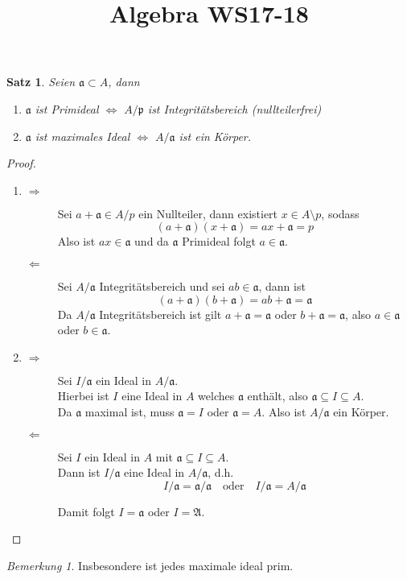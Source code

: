 \documentclass[10pt,a4paper]{article}
\title{Algebra WS17-18}
\theoremstyle{plain}
\newtheorem{satz}[theorem]{Satz}
\theoremstyle{definition}
\theoremstyle{remark}
\newtheorem*{bem*}{Bemerkung}
\begin{document}
	\begin{satz}
		Seien $\mathfrak a\subset A$, dann
		\begin{enumerate}
			\item $\mathfrak a$ ist Primideal $\Leftrightarrow$ $A/\mathfrak p$ ist Integritätsbereich (nullteilerfrei)
			\item $\mathfrak a$ ist maximales Ideal $\Leftrightarrow$ $A/\mathfrak a$ ist ein Körper.
		\end{enumerate}
	\end{satz}
	\begin{proof}
		\begin{enumerate}
			\item \begin{description}
				\item[$\Rightarrow$] Sei $a+\mathfrak a\in A/p$ ein Nullteiler, dann existiert $x\in A\setminus p$, sodass
				\[(a+\mathfrak a)(x+\mathfrak a)=ax+\mathfrak a=p\]
				Also ist $ax\in \mathfrak a$ und da $\mathfrak a$ Primideal folgt $a\in\mathfrak a$.
				\item[$\Leftarrow$] Sei $A/\mathfrak a$ Integritätsbereich und sei $ab\in\mathfrak a$, dann ist
				\[(a+\mathfrak a)(b+\mathfrak a)=ab+\mathfrak a=\mathfrak a\]
				Da $A/\mathfrak a$ Integritätsbereich ist gilt $a+\mathfrak a=\mathfrak a$ oder $b+\mathfrak a=\mathfrak a$, also $a\in\mathfrak a$ oder $b\in\mathfrak a$.
			\end{description}
			\item \begin{description}
				\item[$\Rightarrow$] Sei $I/\mathfrak a$ ein Ideal in $A/\mathfrak a$.\\
				Hierbei ist $I$ eine Ideal in $A$ welches $\mathfrak a$ enthält, also $\mathfrak a\subseteq I\subseteq A$.\\
				Da $\mathfrak a$ maximal ist, muss $\mathfrak a=I$ oder $\mathfrak a=A$. Also ist $A/\mathfrak a$ ein Körper.
				\item[$\Leftarrow$] Sei $I$ ein Ideal in $A$ mit $\mathfrak a\subseteq I\subseteq A$.\\
				Dann ist $I/\mathfrak a$ eine Ideal in $A/\mathfrak a$, d.h.
				\[I/\mathfrak a=\mathfrak a/\mathfrak a\quad\text{oder}\quad I/\mathfrak a=A/\mathfrak a\]
				
				Damit folgt $I=\mathfrak a$ oder $I=\mathfrak A$.
			\end{description}
		\end{enumerate}
	\end{proof}
	\begin{bem*}
		Insbesondere ist jedes maximale ideal prim.
	\end{bem*}
\end{document}
